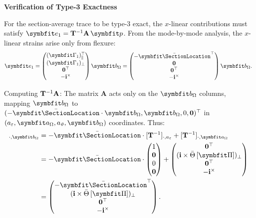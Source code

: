 \begin{Details}
\textbf{Verification of Type-3 Exactness}

For the section-average trace to be type-3 exact, the $x$-linear contributions 
must satisfy $\bm{e}_1 = \TraceDeDpRoot\mathbf{A}\,\bm{p}$. 
From the mode-by-mode analysis, the $x$-linear strains arise only from flexure:
\begin{equation*}
\bm{e}_1 = \begin{pmatrix}
(\bm{\Gamma}_1)_\parallel^\top \\
(\bm{\Gamma}_1)_\perp \\
\mathbf{0}^\top \\
-\FrameBasis^\times
\end{pmatrix} \bm{b}_{\Section}
= \begin{pmatrix}
-\CentroidLocation^\top \\
\mathbf{0} \\
\mathbf{0}^\top \\
-\FrameBasis^\times
\end{pmatrix} \bm{b}_{\Section}.
\end{equation*}

Computing ${\mathbf{T}^{-1}}\mathbf{A}$: The matrix $\mathbf{A}$ acts only on the 
$\bm{b}_{\Section}$ columns, mapping $\bm{b}_{\Section}$ to 
$(-\CentroidLocation \cdot \bm{b}_{\Section}, \bm{b}_{\Section}, 0, \mathbf{0})^\top$ 
in $(a_\varepsilon, \bm{a}_\Omega, a_\vartheta, \bm{b}_{\Section})$ coordinates. Thus:
\begin{align*}
[\TraceDeDpRoot\mathbf{A}]_{\cdot, \bm{b}_{\Section}} 
&= -\CentroidLocation \cdot [\TraceDeDpRoot]_{\cdot, a_\varepsilon} 
+ [\TraceDeDpRoot]_{\cdot, \bm{a}_\Omega} \\
&= -\CentroidLocation \cdot \begin{pmatrix} 1 \\ \mathbf{0} \\ 0 \\ \mathbf{0} \end{pmatrix}
+ \begin{pmatrix} \mathbf{0}^\top \\ (\FrameBasis \times \RotationAverage{\PlaneShape})_\perp \\ \mathbf{0}^\top \\ -\FrameBasis^\times \end{pmatrix} \\
&= \begin{pmatrix} -\CentroidLocation^\top \\ (\FrameBasis \times \RotationAverage{\PlaneShape})_\perp \\ \mathbf{0}^\top \\ -\FrameBasis^\times \end{pmatrix}.
\end{align*}


\end{Details}
